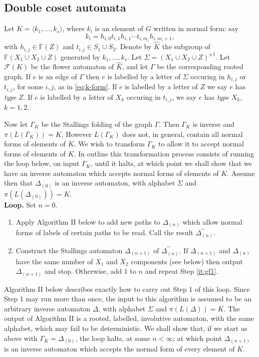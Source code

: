 \documentclass[a4paper,12pt]{article}
\newcommand{\G}{\Gamma }
\newcommand{\D}{\Delta }
\renewcommand{\S}{\Sigma }
\newcommand{\cF}{{\cal{F}}}
\numberwithin{equation}{section}
\numberwithin{figure}{section}
\newcommand{\FF}{\ensuremath{\mathbb{F}}}
\renewcommand{\cF}{\mathcal{F}}
\newcommand{\la}{\langle}
\newcommand{\ra}{\rangle}
\newcommand{\be}{\begin{enumerate}}
\newcommand{\ee}{\end{enumerate}}
\begin{document}
\subsection{Double coset automata}\label{sec:dca}
%
%
Let $K=\la k_1, \ldots , k_s\ra$, where $k_i$ is an element of $G$
written in normal form: say
\begin{equation}\label{eq:k-form}
k_i= h_{i,0}t_{i,1}h_{i,1}\cdots t_{i,m_i}h_{i,m_i+1},
\end{equation}
with $h_{i,j}\in \FF(Z)$ and $t_{i,j}\in S_1\cup S_2$. Denote
by $\hat K$ the subgroup of  $\FF(X_1\cup X_2 \cup Z)$ generated by
$k_1, \ldots , k_s$. Let $\S=(X_1\cup X_2 \cup Z)^{\pm 1}$.
Let $\cF(K)$ be the flower automaton of $\hat K$, and let
$\G$ be the corresponding rooted graph. If $e$ is an edge of $\G$ then
$e$ is labelled by a letter of $\S$
occuring in $h_{i,j}$ or $t_{i,j}$, for some $i,j$, as in
\eqref{eq:k-form}. If $e$ is labelled by a letter of $Z$ we say $e$ has {\em type} $Z$.
If $e$ is labelled by a letter of $X_k$ occuring in $t_{i,j}$, we
say $e$ has {\em type} $X_k$, $k = 1,2$.

Now let $\G_K$ be the Stallings folding of the graph $\G$.  Then
 $\G_K$ is inverse and $\pi(L(\G_K))=K$. However
$L(\G_K)$ does not, in general, contain all normal forms of elements of $K$.
We wish to transform $\G_K$ to allow it to accept normal forms of
elements of $K$. In outline this transformation process consists of
running the loop below, on input $\G_K$,
until it halts, at which point we shall show that we have an
inverse automaton which accepts  normal forms of elements of $K$.
Assume then that $\D_{(0)}$ is an inverse automaton, with alphabet $\S$
and $\pi(L(\D_{(0)}))=K$. \\[1em]
\textbf{Loop.}
Set $n=0$.
\be[Step 1.]
\item\label{it:gf1} Apply Algorithm II below to add new paths to $\D_{(n)}$ which allow normal forms of labels
of certain paths to be read. %
Call the result $\D_{(n)}^{\prime\prime}$.
\item\label{it:gf2} Construct the Stallings automaton $\D_{(n+1)}$
of $\D_{(n)}^{\prime\prime}$. If $\D_{(n+1)}$ and
$\D_{(n)}$ have the same
 number of
$X_1$ and $X_2$ components (see below) then output $\D_{(n+1)}$
and stop. Otherwise, add $1$ to $n$ and  repeat Step \ref{it:gf1}.
\ee

Algorithm II below describes exactly how to carry out Step 1 of
this loop. Since Step 1 may run more than once,  the input to this
algorithm is assumed to be an arbitrary inverse automaton $\D$,
with alphabet $\S$ and $\pi(L(\D))=K$. The output of Algorithm II 
is a rooted,
labelled, involutive automaton, with the same alphabet, which may
fail to be deterministic. We shall show that, if we start as above
with $\G_K=\D_{(0)}$,  the loop halts, at some $n<\infty$; at
which point $\D_{(n+1)}$ is an inverse automaton which accepts the
normal form of every element of $K$. \\[1em]
\end{document}
